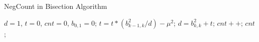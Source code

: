 \begin{algorithm}
\caption{NegCount in Bisection Algorithm}
\label{alg:negcount}
\begin{algorithmic}[1]
  \State $d=1$, $t=0$, $cnt=0$, $b_{0,1}=0$;
    \State $t = t * (b_{k-1,k}^2 / d) - \mu^2$;
    \State $d = b_{k,k}^2 + t$;
      \State $cnt++$;
    \EndIf
  \EndFor
  \State \Return $cnt$;
\EndProcedure
\end{algorithmic}
\end{algorithm}

